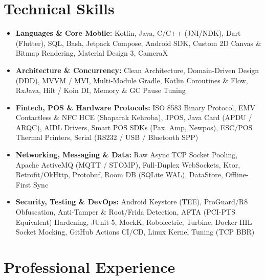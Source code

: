 \documentclass[letterpaper,10pt]{article}
\newcommand{\resumeItem}[1]{
  \item\small{#1}
}
\begin{document}
\section{Technical Skills}
\begin{itemize}
  \resumeItem{\textbf{Languages \& Core Mobile:} Kotlin, Java, C/C++ (JNI/NDK), Dart (Flutter), SQL, Bash, Jetpack Compose, Android SDK, Custom 2D Canvas \& Bitmap Rendering, Material Design 3, CameraX}
  \resumeItem{\textbf{Architecture \& Concurrency:} Clean Architecture, Domain-Driven Design (DDD), MVVM / MVI, Multi-Module Gradle, Kotlin Coroutines \& Flow, RxJava, Hilt / Koin DI, Memory \& GC Pause Tuning}
  \resumeItem{\textbf{Fintech, POS \& Hardware Protocols:} ISO 8583 Binary Protocol, EMV Contactless \& NFC HCE (Shaparak Kehroba), JPOS, Java Card (APDU / ARQC), AIDL Drivers, Smart POS SDKs (Pax, Amp, Newpos), ESC/POS Thermal Printers, Serial (RS232 / USB / Bluetooth SPP)}
  \resumeItem{\textbf{Networking, Messaging \& Data:} Raw Async TCP Socket Pooling, Apache ActiveMQ (MQTT / STOMP), Full-Duplex WebSockets, Ktor, Retrofit/OkHttp, Protobuf, Room DB (SQLite WAL), DataStore, Offline-First Sync}
  \resumeItem{\textbf{Security, Testing \& DevOps:} Android Keystore (TEE), ProGuard/R8 Obfuscation, Anti-Tamper \& Root/Frida Detection, AFTA (PCI-PTS Equivalent) Hardening, JUnit 5, MockK, Robolectric, Turbine, Docker HIL Socket Mocking, GitHub Actions CI/CD, Linux Kernel Tuning (TCP BBR)}
\end{itemize}

\section{Professional Experience}
\end{document}

